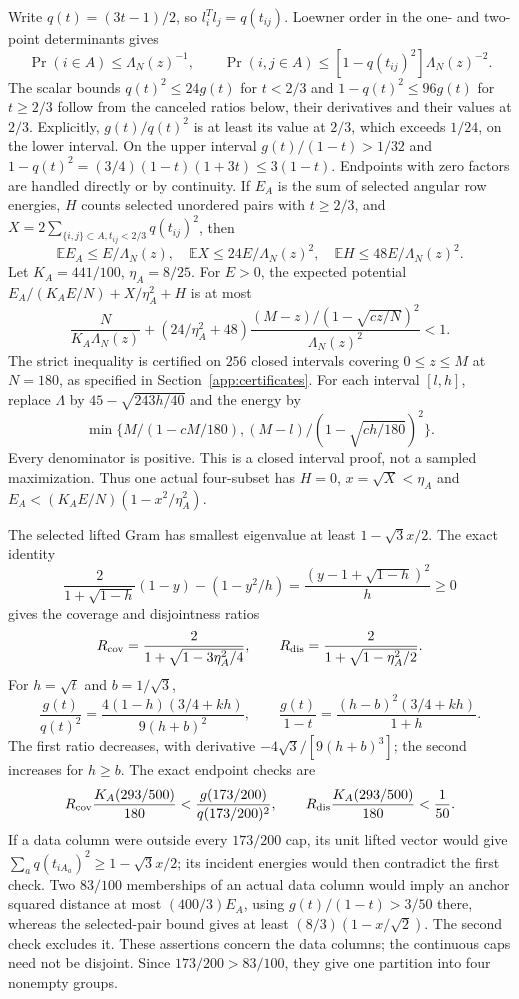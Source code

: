 Write $q(t)=(3t-1)/2$, so $l_i^Tl_j=q(t_{ij})$.
Loewner order in the one- and two-point determinants gives
\[
 \Pr(i\in A)\le\Lambda_N(z)^{-1},\qquad
 \Pr(i,j\in A)\le[1-q(t_{ij})^2]\Lambda_N(z)^{-2}.
\]
The scalar bounds
$q(t)^2\le24g(t)$ for $t<2/3$ and
$1-q(t)^2\le96g(t)$ for $t\ge2/3$ follow from the canceled ratios
below, their derivatives and their values at $2/3$.
Explicitly, $g(t)/q(t)^2$ is at least its value at $2/3$, which exceeds
$1/24$, on the lower interval. On the upper interval
$g(t)/(1-t)>1/32$ and
$1-q(t)^2=(3/4)(1-t)(1+3t)\le3(1-t)$. Endpoints with zero factors
are handled directly or by continuity.
If $E_A$ is the sum of selected angular row energies, $H$ counts
selected unordered pairs with $t\ge2/3$, and
$X=2\sum_{\{i,j\}\subset A,t_{ij}<2/3}q(t_{ij})^2$, then
\[
 \mathbb E E_A\le E/\Lambda_N(z),\quad
 \mathbb E X\le24E/\Lambda_N(z)^2,\quad
 \mathbb E H\le48E/\Lambda_N(z)^2.
\]
Let $K_A=441/100$, $\eta_A=8/25$. For $E>0$, the expected potential
$E_A/(K_AE/N)+X/\eta_A^2+H$ is at most
\begin{equation}\label{app:global:potential}
 \frac{N}{K_A\Lambda_N(z)}+
 \left(24/\eta_A^2+48\right)
 \frac{(M-z)/(1-\sqrt{cz/N})^2}{\Lambda_N(z)^2}<1.
\end{equation}
The strict inequality is certified on $256$ closed intervals covering
$0\le z\le M$ at $N=180$, as specified in
Section~\ref{app:certificates}. For each interval $[l,h]$, replace
$\Lambda$ by $45-\sqrt{243h/40}$ and the energy by
\[
 \min\{M/(1-cM/180),(M-l)/(1-\sqrt{ch/180})^2\}.
\]
Every denominator is positive. This is a closed interval proof, not a
sampled maximization. Thus one actual four-subset has $H=0$, $x=\sqrt X<\eta_A$
and $E_A<(K_AE/N)(1-x^2/\eta_A^2)$.

The selected lifted Gram has smallest eigenvalue at least
$1-\sqrt3x/2$. The exact identity
\[
 \frac2{1+\sqrt{1-h}}(1-y)-(1-y^2/h)
       =\frac{(y-1+\sqrt{1-h})^2}{h}\ge0
\]
gives the coverage and disjointness ratios
\[
 R_{\rm cov}=\frac2{1+\sqrt{1-3\eta_A^2/4}},\qquad
 R_{\rm dis}=\frac2{1+\sqrt{1-\eta_A^2/2}}.
\]
For $h=\sqrt t$ and $b=1/\sqrt3$,
\[
 \frac{g(t)}{q(t)^2}=\frac{4(1-h)(3/4+kh)}{9(h+b)^2},\qquad
 \frac{g(t)}{1-t}=\frac{(h-b)^2(3/4+kh)}{1+h}.
\]
The first ratio decreases, with derivative $-4\sqrt3/[9(h+b)^3]$;
the second increases for $h\ge b$. The exact endpoint checks are
\[
 R_{\rm cov}\frac{K_A(293/500)}{180}
   <\frac{g(173/200)}{q(173/200)^2},\qquad
 R_{\rm dis}\frac{K_A(293/500)}{180}<\frac1{50}.
\]
If a data column were outside every $173/200$ cap, its unit lifted vector
would give $\sum_a q(t_{iA_a})^2\ge1-\sqrt3x/2$; its incident energies
would then contradict the first check. Two $83/100$ memberships of an
actual data column would imply an anchor squared distance at most
$(400/3)E_A$, using $g(t)/(1-t)>3/50$ there, whereas the selected-pair
bound gives at least $(8/3)(1-x/\sqrt2)$. The second check excludes it.
These assertions concern the data columns; the continuous caps need
not be disjoint. Since $173/200>83/100$, they give one partition into
four nonempty groups.

